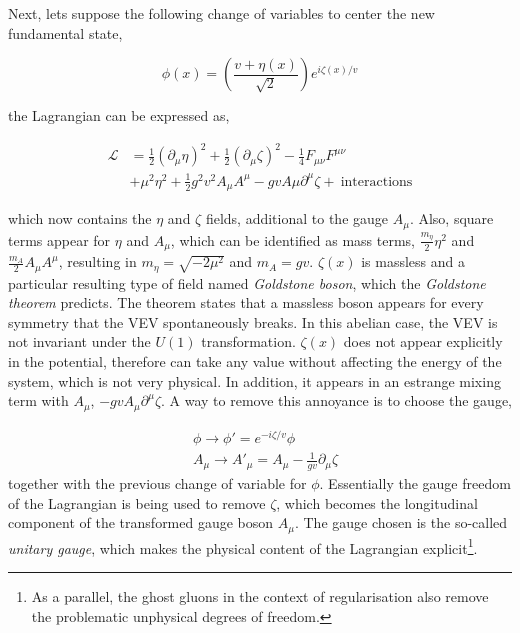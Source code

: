 Next, lets suppose the following change of variables to center the new fundamental state,

\begin{equation}
    \phi(x)=\left( \frac{v+\eta(x)}{\sqrt{2}} \right) e^{i\zeta(x)/v}
\end{equation}

the Lagrangian can be expressed as,

\begin{equation}
\begin{split}
\mathcal{L} &= \frac{1}{2}(\partial_\mu\eta)^2 + \frac{1}{2}(\partial_\mu\zeta)^2 - \frac{1}{4}F_{\mu\nu}F^{\mu\nu}\\
&+\mu^2\eta^2 + \frac{1}{2}g^2v^2A_\mu A^\mu - gv A\mu \partial^\mu\zeta +\ \text{interactions}
\end{split}
\end{equation}

which now contains the $\eta$ and $\zeta$ fields, additional to the gauge $A_\mu$. Also, square terms appear for $\eta$ and $A_\mu$,
which can be identified as mass terms, $\frac{m_\eta}{2}\eta^2$ and $\frac{m_A}{2}A_\mu A^\mu$,
resulting in $m_\eta=\sqrt{-2\mu^2}$ and $m_A=gv$. $\zeta(x)$ is massless and a particular resulting type of field named
\textit{Goldstone boson}, which the \textit{Goldstone theorem} predicts.
The theorem states that a massless boson appears for every symmetry that the \acrshort{VEV} spontaneously breaks.
In this abelian case, the \acrshort{VEV} is not invariant under the $U(1)$ transformation.
$\zeta(x)$ does not appear explicitly in the potential, therefore can take any value without affecting the energy of the system,
which is not very physical. In addition, it appears in an estrange mixing term with $A_\mu$, $-gvA_\mu\partial^\mu\zeta$.
A way to remove this annoyance is to choose the gauge,

\begin{equation}
\begin{split}
    &\phi\rightarrow\phi'=e^{-i\zeta/v}\phi \\
    &A_\mu\rightarrow A'_\mu = A_\mu-\frac{1}{gv}\partial_\mu\zeta
\end{split}
\end{equation}
together with the previous change of variable for $\phi$. Essentially the gauge freedom of the Lagrangian is being used to remove $\zeta$,
which becomes the longitudinal component of the transformed gauge boson $A_\mu$.
The gauge chosen is the so-called \textit{unitary gauge}, which makes the physical content of the Lagrangian explicit\footnote{As a parallel, the ghost gluons in the context of regularisation also remove the problematic unphysical degrees of freedom.}.

